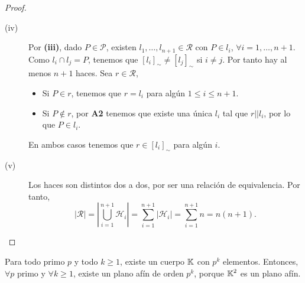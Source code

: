 \begin{proof}
\begin{description}
\item[(iv)] Por \textbf{(iii)}, dado $\displaystyle P \in \mathcal{P} $, existen $\displaystyle l_{1}, \ldots, l_{n+1} \in \mathcal{R} $ con $\displaystyle P \in l_{i} $, $\displaystyle \forall i = 1, \ldots, n +1$. Como $\displaystyle l_{i} \cap l_{j} = P $, tenemos que $\displaystyle \left[l_{i}\right]_{\sim} \neq \left[l_{j}\right]_{\sim}  $ si $\displaystyle i \neq j $. Por tanto hay al menos $\displaystyle n + 1 $ haces. Sea $\displaystyle r \in \mathcal{R} $, 
	\begin{itemize}
	\item Si $\displaystyle P \in r $, tenemos que $\displaystyle r = l_{i} $ para algún $\displaystyle 1 \leq i \leq n +1 $.
	\item Si $\displaystyle P \not\in r $, por \textbf{A2} tenemos que existe una única $\displaystyle l_{i} $ tal que $\displaystyle r | | l_{i} $, por lo que $\displaystyle P \in l_{i} $.
	\end{itemize}
	En ambos casos tenemos que $\displaystyle r \in \left[l_{i}\right] _{\sim} $ para algún $\displaystyle i $.
\item[(v)] Los haces son distintos dos a dos, por ser una relación de equivalencia. Por tanto, 
	\[ \left|\mathcal{R}\right| = \left|\bigcup_{i = 1}^{n+1}\mathcal{H}_{i}\right| = \sum^{n + 1}_{ i = 1} \left|\mathcal{H}_{i}\right| = \sum^{n+1}_{i = 1}n = n\left(n+1\right) .\]
\end{description}
\end{proof}
\begin{observation}
Para todo primo $\displaystyle p $ y todo $\displaystyle k \geq 1 $, existe un cuerpo $\displaystyle \mathbb{K} $ con $\displaystyle p^{k} $ elementos. Entonces, $\displaystyle \forall p $ primo y $\displaystyle \forall k \geq 1 $, existe un plano afín de orden $\displaystyle p ^{k} $, porque $\displaystyle \mathbb{K}^{2} $ es un plano afín.
\end{observation}
